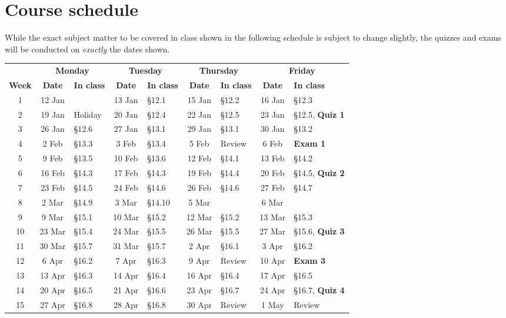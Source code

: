 \documentclass[11pt]{article}
\begin{document}
\section{Course schedule}\label{Schedule} While the exact subject
matter to be covered in class shown in the following schedule is
subject to change slightly, the quizzes and exams will be conducted
on {\em exactly} the dates shown.

\begin{tabular}{c|cl|cl|cl|cl}
&\multicolumn{2}{c|}{\bf Monday}
&\multicolumn{2}{c|}{\bf Tuesday}
&\multicolumn{2}{c|}{\bf Thursday}
&\multicolumn{2}{c}{\bf Friday}\\
{\bf Week}&{\bf Date}&{\bf In class}
&{\bf Date}&{\bf In class}&{\bf Date}&{\bf In class}
&{\bf Date}&{\bf In class}\\\toprule
1&12 Jan&&13 Jan&\S12.1&15 Jan&\S12.2&16 Jan&\S12.3\\\midrule
2&19 Jan&Holiday&20 Jan&\S12.4&22 Jan&\S12.5&23 Jan&\S12.5, {\bf Quiz 1}\\\midrule
3&26 Jan&\S12.6&27 Jan&\S13.1&29 Jan&\S13.1&30 Jan&\S13.2\\\midrule
4&2 Feb&\S13.3&3 Feb&\S13.4&5 Feb&Review&6 Feb&{\bf Exam 1}\\\midrule
5&9 Feb&\S13.5&10 Feb&\S13.6&12 Feb&\S14.1&13 Feb&\S14.2\\\midrule
6&16 Feb&\S14.3&17 Feb&\S14.3&19 Feb&\S14.4&20 Feb&\S14.5, {\bf Quiz 2}\\\midrule
7&23 Feb&\S14.5&24 Feb&\S14.6&26 Feb&\S14.6&27 Feb&\S14.7\\\midrule
8&2 Mar&\S14.9&3 Mar&\S14.10&5 Mar&&6 Mar&\\\midrule
9&9 Mar&\S15.1&10 Mar&\S15.2&12 Mar&\S15.2&13 Mar&\S15.3 \\\midrule
10&23 Mar&\S15.4&24 Mar&\S15.5&26 Mar&\S15.5&27 Mar&\S15.6, {\bf Quiz 3}\\\midrule
11&30 Mar&\S15.7&31 Mar&\S15.7&2 Apr&\S16.1&3 Apr&\S16.2\\\midrule
12&6 Apr&\S16.2&7 Apr&\S16.3&9 Apr&Review&10 Apr&{\bf Exam 3}\\\midrule
13&13 Apr&\S16.3&14 Apr&\S16.4&16 Apr&\S16.4&17 Apr&\S16.5\\\midrule
14&20 Apr&\S16.5&21 Apr&\S16.6&23 Apr&\S16.7&24 Apr&\S16.7, {\bf Quiz 4}\\\midrule
15&27 Apr&\S16.8&28 Apr&\S16.8&30 Apr&Review&1 May&Review\\\midrule
\end{tabular}
\end{document}
